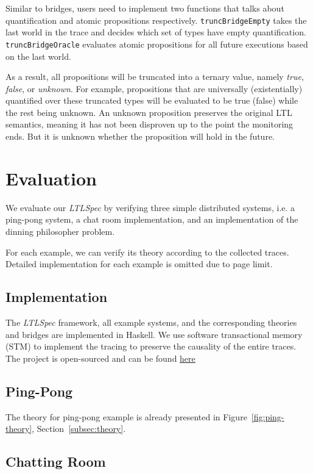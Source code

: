 \documentclass[format=acmsmall, nonacm=true, review=true, screen=true]{acmart}
\newcommand{\ltlspec}{\textit{LTLSpec}\xspace}
\begin{document}
Similar to bridges, users need to implement two functions that talks about quantification and atomic propositions respectively.
\texttt{truncBridgeEmpty} takes the last world in the trace and decides which set of types have empty quantification.
\texttt{truncBridgeOracle} evaluates atomic propositions for all future executions based on the last world.

As a result, all propositions will be truncated into a ternary value, namely \textit{true}, \textit{false}, or \textit{unknown}.
For example, propositions that are universally (existentially) quantified over these truncated types will be evaluated to be true (false) while the rest being unknown.
An unknown proposition preserves the original LTL semantics, meaning it has not been disproven up to the point the monitoring ends. But it is unknown whether the proposition will hold in the future.

\section{Evaluation}

We evaluate our \ltlspec by verifying three simple distributed systems, i.e. a ping-pong system, a chat room implementation, and an implementation of the dinning philosopher problem.

For each example, we can verify its theory according to the collected traces. Detailed implementation for each example is omitted due to page limit.

\subsection{Implementation}

The \ltlspec framework, all example systems, and the corresponding theories and bridges are implemented in Haskell.
We use software transactional memory (STM) to implement the tracing to preserve the causality of the entire traces.
The project is open-sourced and can be found \href{https://github.com/ejconlon/ltlspec}{here}

\subsection{Ping-Pong}

The theory for ping-pong example is already presented in Figure~\ref{fig:ping-theory}, Section~\ref{subsec:theory}.

\subsection{Chatting Room}
\end{document}
